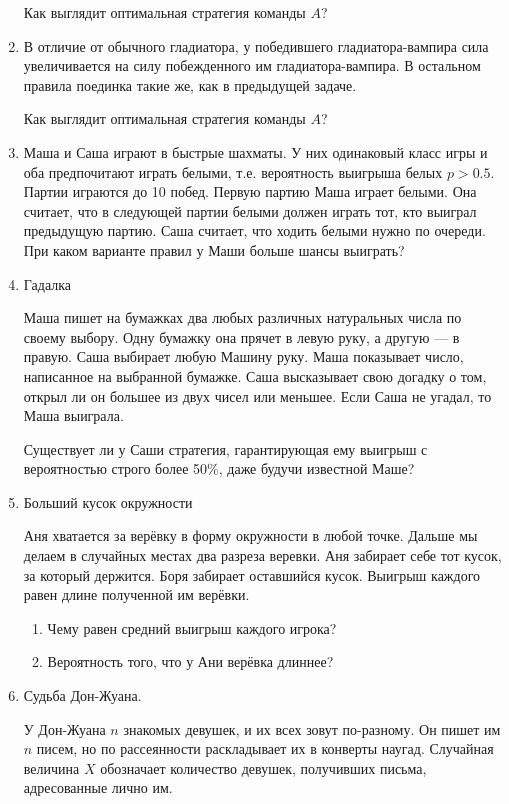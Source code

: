 \documentclass{tufte-handout}
\begin{document}
\begin{enumerate}
Как выглядит оптимальная стратегия команды $A$?

\item В отличие от обычного гладиатора, у победившего гладиатора-вампира сила увеличивается на силу побежденного им гладиатора-вампира. В остальном правила поединка такие же, как в предыдущей задаче.

Как выглядит оптимальная стратегия команды $A$?

\item Маша и Саша играют в быстрые шахматы. У них одинаковый класс игры и оба предпочитают играть белыми, т.е. вероятность выигрыша белых  $p>0.5$. Партии играются до 10 побед. Первую партию Маша играет белыми. Она считает, что в следующей партии белыми должен играть тот, кто выиграл предыдущую партию. Саша считает, что ходить белыми нужно по очереди. При каком варианте правил у Маши больше шансы выиграть?

\item Гадалка

Маша пишет на бумажках два любых различных натуральных числа по своему выбору. Одну бумажку она прячет в левую руку, а другую --- в правую. Саша выбирает любую Машину руку. Маша показывает число, написанное на выбранной бумажке. Саша высказывает свою догадку о том, открыл ли он большее из двух чисел или меньшее. Если Саша не угадал, то Маша выиграла.

Существует ли у Саши стратегия, гарантирующая ему выигрыш с вероятностью строго более 50\%, даже будучи известной Маше?

\item Больший кусок окружности

Аня хватается за верёвку в форму окружности в любой точке. Дальше мы делаем в случайных местах два разреза веревки. Аня забирает себе тот кусок, за который держится. Боря забирает оставшийся кусок. Выигрыш каждого равен длине полученной им верёвки. 
\begin{enumerate}
\item Чему равен средний выигрыш каждого игрока?
\item  Вероятность того, что у Ани верёвка длиннее?
\end{enumerate}


\item Судьба Дон-Жуана. 

У Дон-Жуана $n$  знакомых девушек, и их всех зовут по-разному. Он пишет
им $n$  писем, но по рассеянности раскладывает их в конверты
наугад. Случайная величина $X$ обозначает количество девушек, получивших письма, адресованные лично им.


\end{enumerate}
\end{document}
